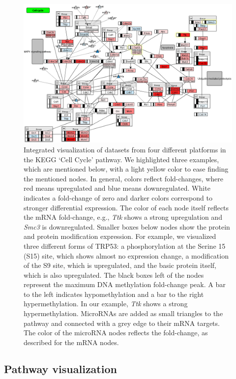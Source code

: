\documentclass{bioinfo}
\begin{document}
\begin{figure}
\centering
\includegraphics[width=.675\textwidth]{figures/mmu04110_highlight.png}
\caption{Integrated visualization of datasets from four different platforms in the KEGG `Cell Cycle' pathway.
We highlighted three examples, which are mentioned below, with a light yellow color to ease
finding the mentioned nodes.
In general, colors reflect fold-changes, where red means upregulated and blue means
downregulated. White indicates a fold-change of zero and darker colors correspond to stronger
differential expression. The color of each node itself reflects the mRNA fold-change, e.g., \emph{Ttk}
shows a strong upregulation and \emph{Smc3} is downregulated. Smaller boxes below nodes show the protein
and protein modification expression. For example, we visualized three different forms of TRP53: a
phosphorylation at the Serine 15 (S15) site, which shows almost no expression change, a modification
of the S9 site, which is upregulated, and the basic protein itself, which is also upregulated. The
black boxes left of the nodes represent the maximum DNA methylation fold-change peak. A bar to the
left indicates hypomethylation and a bar to the right hypermethylation. In our example, \emph{Ttk} shows
a strong hypermethylation. MicroRNAs are added as small triangles to the pathway and connected with
a grey edge to their mRNA targets. The color of the microRNA nodes reflects the fold-change, as
described for the mRNA nodes.}
\label{fig:cellcycle}
\end{figure}

\subsection{Pathway visualization}
\end{document}
